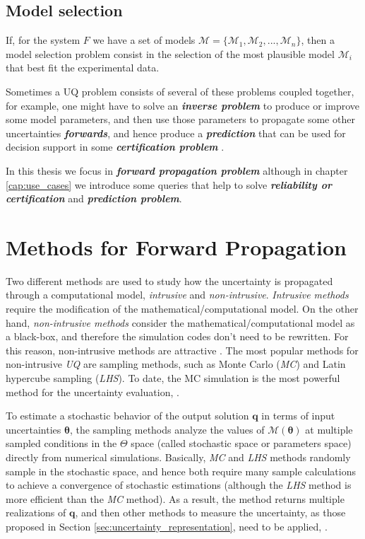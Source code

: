 \subsection{Model selection}
If, for the system $F$ we have a set of models $\mathcal{M} = \lbrace \mathcal{M}_{1}, \mathcal{M}_{2},...,\mathcal{M}_{n} \rbrace$, then a model selection problem consist in the selection of the most plausible model $\mathcal{M}_{i}$ that best fit the experimental data.

Sometimes a UQ problem consists of several of these problems coupled together, for example, one might have to solve an \textbf{\textit{inverse problem}} to produce or improve some model parameters, and then use those parameters to propagate some other uncertainties \textbf{\textit{forwards}}, and hence produce a \textbf{\textit{prediction}} that can be used for decision support in some \textbf{\textit{certification problem}} \cite{Sullivan2015}.

In this thesis we focus in \textbf{\textit{forward propagation problem}} although in chapter \ref{cap:use_cases} we introduce some queries that help to solve \textbf{\textit{reliability or certification}} and \textbf{\textit{prediction problem}}.

\section{Methods for Forward Propagation}\label{sec:methods_uq_propagation}

Two different methods are used to study how the uncertainty is propagated through a computational model, \textit{intrusive} and \textit{non-intrusive}. \textit{Intrusive methods} require the modification of the mathematical/computational model. On the other hand, \textit{non-intrusive methods} consider the mathematical/computational model as a black-box, and therefore the simulation codes don't need to be rewritten. For this reason, non-intrusive methods are attractive \cite{Kawai2014}. The most popular methods for non-intrusive \textit{UQ} are sampling methods, such as Monte Carlo (\textit{MC}) and Latin hypercube sampling (\textit{LHS}). To date, the MC simulation is the most powerful method for the uncertainty evaluation, \cite{Rajan2016a}.

To estimate a stochastic behavior of the output solution $\bm{q}$  in terms of input uncertainties $\bm{\theta}$, the sampling methods analyze the values of $\mathcal{M}(\bm{\theta})$ at multiple sampled conditions in the $\Theta$ space (called stochastic space or parameters space) directly from numerical simulations. Basically, \textit{MC} and \textit{LHS} methods randomly sample in the stochastic space, and hence both require many sample calculations to achieve a convergence of stochastic estimations (although the \textit{LHS} method is more efficient than the \textit{MC} method). As a result, the method returns multiple realizations of $\bm{q}$, and then other methods to measure the uncertainty, as those proposed in Section \ref{sec:uncertainty_representation}, need to be applied,  \cite{Baxter2016, Estacio-Hiroms2012, Farrell2015}. 

